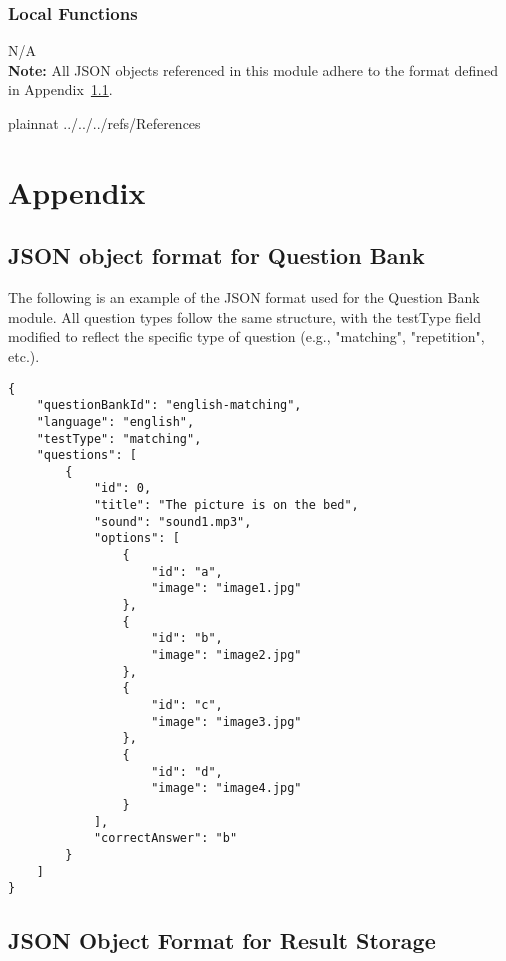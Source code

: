 \documentclass[12pt, titlepage]{article}
\begin{document}
\subsubsection{Local Functions}

N/A\\
\noindent \textbf{Note:} All JSON objects referenced in this module adhere to the format defined in Appendix~\ref{JSONQuestionbank}.

\newpage

 {plainnat}
 {../../../refs/References}

\newpage

\newpage{}

\section{Appendix}
\subsection{JSON object format for Question Bank} \label{JSONQuestionbank}
The following is an example of the JSON format used for the Question Bank module. All question types follow the same structure, with the testType field modified to reflect the specific type of question (e.g., "matching", "repetition", etc.).

\begin{verbatim}
{
    "questionBankId": "english-matching",
    "language": "english",
    "testType": "matching",
    "questions": [
        {
            "id": 0,
            "title": "The picture is on the bed",
            "sound": "sound1.mp3",
            "options": [
                {
                    "id": "a",
                    "image": "image1.jpg"
                },
                {
                    "id": "b",
                    "image": "image2.jpg"
                },
                {
                    "id": "c",
                    "image": "image3.jpg"
                },
                {
                    "id": "d",
                    "image": "image4.jpg"
                }
            ],
            "correctAnswer": "b"
        }
    ]
}
\end{verbatim}

\subsection{JSON Object Format for Result Storage}\label{JSONResultStorage}
\end{document}
